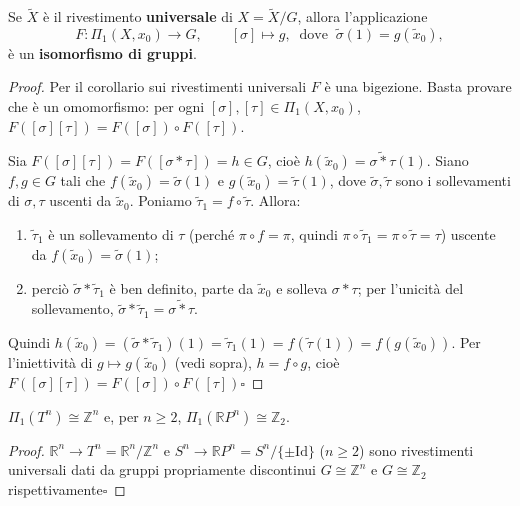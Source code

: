 \begin{teo}
Se $\widetilde{X}$ \`e il rivestimento \textbf{universale} di $X = \widetilde{X}/G$, allora l'applicazione
\[
F: \Pi_1(X, x_0) \longrightarrow G, \qquad [\sigma] \longmapsto g, \ \text{ dove } \ \widetilde{\sigma}(1) = g(\widetilde{x}_0),
\]
\`e un \textbf{isomorfismo di gruppi}.
\end{teo}
\begin{proof}
Per il corollario sui rivestimenti universali $F$ \`e una bigezione. Basta provare che \`e un omomorfismo: per ogni $[\sigma], [\tau] \in \Pi_1(X, x_0)$, $F([\sigma][\tau]) = F([\sigma]) \circ F([\tau])$.

Sia $F([\sigma][\tau]) = F([\sigma * \tau]) = h \in G$, cio\`e $h(\widetilde{x}_0) = \widetilde{\sigma * \tau}(1)$. Siano $f, g \in G$ tali che $f(\widetilde{x}_0) = \widetilde{\sigma}(1)$ e $g(\widetilde{x}_0) = \widetilde{\tau}(1)$, dove $\widetilde{\sigma}, \widetilde{\tau}$ sono i sollevamenti di $\sigma, \tau$ uscenti da $\widetilde{x}_0$. Poniamo $\widetilde{\tau}_1 = f \circ \widetilde{\tau}$. Allora:
\begin{enumerate}
    \item $\widetilde{\tau}_1$ \`e un sollevamento di $\tau$ (perch\'e $\pi \circ f = \pi$, quindi $\pi \circ \widetilde{\tau}_1 = \pi \circ \widetilde{\tau} = \tau$) uscente da $f(\widetilde{x}_0) = \widetilde{\sigma}(1)$;
    \item perci\`o $\widetilde{\sigma} * \widetilde{\tau}_1$ \`e ben definito, parte da $\widetilde{x}_0$ e solleva $\sigma * \tau$; per l'unicit\`a del sollevamento, $\widetilde{\sigma} * \widetilde{\tau}_1 = \widetilde{\sigma * \tau}$.
\end{enumerate}
Quindi $h(\widetilde{x}_0) = (\widetilde{\sigma} * \widetilde{\tau}_1)(1) = \widetilde{\tau}_1(1) = f(\widetilde{\tau}(1)) = f(g(\widetilde{x}_0))$. Per l'iniettivit\`a di $g \mapsto g(\widetilde{x}_0)$ (vedi sopra), $h = f \circ g$, cio\`e $F([\sigma][\tau]) = F([\sigma]) \circ F([\tau])$\hfill$\square$
\end{proof}

\begin{coro}
$\Pi_1(T^n) \cong \mathbb{Z}^n$ e, per $n \geqslant 2$, $\Pi_1(\mathbb{R}P^n) \cong \mathbb{Z}_2$.
\end{coro}
\begin{proof}
$\mathbb{R}^n \to T^n = \mathbb{R}^n/\mathbb{Z}^n$ e $S^n \to \mathbb{R}P^n = S^n/\{\pm\mathrm{Id}\}$ ($n \geqslant 2$) sono rivestimenti universali dati da gruppi propriamente discontinui $G \cong \mathbb{Z}^n$ e $G \cong \mathbb{Z}_2$ rispettivamente\hfill$\square$
\end{proof}


